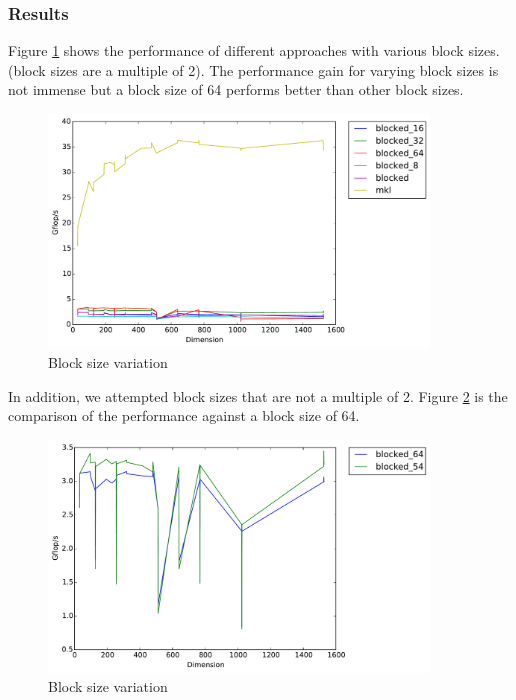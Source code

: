 \documentclass[11pt]{article}
\theoremstyle{plain}
\theoremstyle{definition}
\begin{document}
\subsubsection{Results}
Figure \ref{pow_2_blocks} shows the performance of different approaches with various block sizes. (block sizes are a multiple of 2). The performance gain for varying block sizes is not immense but a block size of 64 performs better than other block sizes. \\

\begin{figure}[H]
    \includegraphics[width=0.9\textwidth]{timing_block_size_changes.pdf}
    \caption{Block size variation}
    \label{pow_2_blocks}
\end{figure} 

In addition, we attempted block sizes that are not a multiple of 2. Figure \ref{odd_blocks} is the comparison of the performance against a block size of 64.\\
\begin{figure}[H]
    \includegraphics[width=0.9\textwidth]{timing_54_64.pdf}
    \caption{Block size variation}
    \label{odd_blocks}
\end{figure} 
\end{document}
